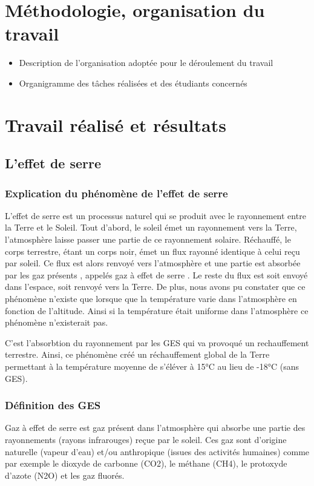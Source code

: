 \documentclass[a4paper, 12pt]{report} %
\begin{document}
\chapter{Méthodologie, organisation du travail}

\begin{itemize}
\item Description de l'organisation adoptée pour le déroulement du travail
\item Organigramme des tâches réalisées et des étudiants concernés
\end{itemize}


\chapter{Travail réalisé et résultats}

\section{L'effet de serre}

\subsection{Explication du phénomène de l'effet de serre}

L’effet de serre est un processus naturel qui se produit avec le rayonnement 
entre la Terre et le Soleil. Tout d'abord, le soleil émet un rayonnement vers la Terre, 
l'atmosphère laisse passer une partie de ce rayonnement solaire. Réchauffé, le corps terrestre, 
étant un corps noir, émet un flux rayonné identique à celui reçu par soleil. Ce flux est 
alors renvoyé vers l'atmosphère et une partie est absorbée par les gaz présents , appelés 
gaz à effet de serre . Le reste du flux est soit envoyé dans l'espace, soit renvoyé vers la Terre. 
De plus, nous avons pu constater que ce phénomène n'existe que lorsque que la température varie 
dans l'atmosphère en fonction de l'altitude. Ainsi si la température était uniforme dans 
l'atmosphère ce phénomène n'existerait pas. 



C'est l'absorbtion du rayonnement par les GES qui va provoqué un rechauffement terrestre. 
Ainsi, ce phénomène créé un réchauffement global de la Terre permettant à la température 
moyenne de s'éléver à 15°C au lieu de -18°C (sans GES).  

\subsection{Définition des GES}
Gaz à effet de serre est gaz présent dans l’atmosphère qui absorbe une partie des rayonnements (rayons infrarouges) reçue par le soleil. Ces gaz sont d’origine naturelle (vapeur d’eau) et/ou anthropique (issues des activités humaines) comme par exemple le dioxyde de carbonne (CO2), le méthane (CH4), le protoxyde d'azote (N2O) et les gaz fluorés. 
 \vspace{\baselineskip}
\end{document}
